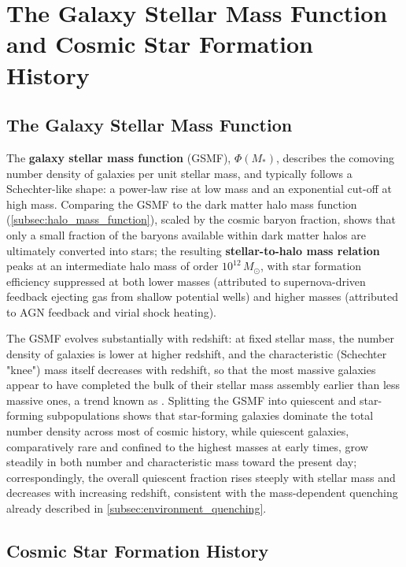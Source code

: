 \section{The Galaxy Stellar Mass Function and Cosmic Star Formation History} \label{sec:gsmf_csfh}

\subsection{The Galaxy Stellar Mass Function} \label{subsec:gsmf}

The \textbf{galaxy stellar mass function} (GSMF), $\Phi(M_*)$, describes the comoving number density of galaxies per unit stellar mass, and typically follows a Schechter-like shape: a power-law rise at low mass and an exponential cut-off at high mass. Comparing the GSMF to the dark matter halo mass function (\cref{subsec:halo_mass_function}), scaled by the cosmic baryon fraction, shows that only a small fraction of the baryons available within dark matter halos are ultimately converted into stars; the resulting \textbf{stellar-to-halo mass relation} peaks at an intermediate halo mass of order $10^{12}\,M_\odot$, with star formation efficiency suppressed at both lower masses (attributed to supernova-driven feedback ejecting gas from shallow potential wells) and higher masses (attributed to AGN feedback and virial shock heating).

\medskip

The GSMF evolves substantially with redshift: at fixed stellar mass, the number density of galaxies is lower at higher redshift, and the characteristic (Schechter "knee") mass itself decreases with redshift, so that the most massive galaxies appear to have completed the bulk of their stellar mass assembly earlier than less massive ones, a trend known as . Splitting the GSMF into quiescent and star-forming subpopulations shows that star-forming galaxies dominate the total number density across most of cosmic history, while quiescent galaxies, comparatively rare and confined to the highest masses at early times, grow steadily in both number and characteristic mass toward the present day; correspondingly, the overall quiescent fraction rises steeply with stellar mass and decreases with increasing redshift, consistent with the mass-dependent quenching already described in \cref{subsec:environment_quenching}.

\subsection{Cosmic Star Formation History} \label{subsec:csfh}

